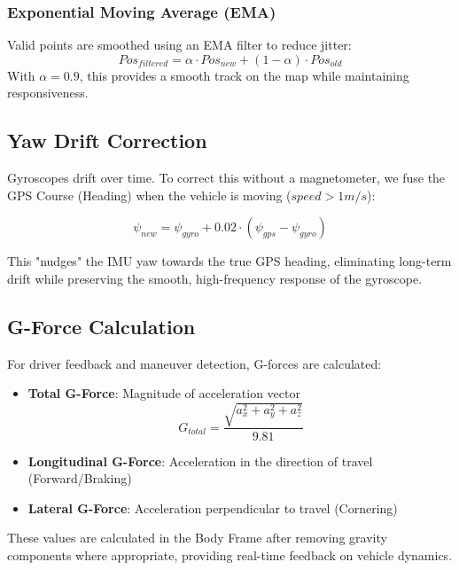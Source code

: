 \documentclass[11pt,a4paper]{article}
\begin{document}
\subsubsection{Exponential Moving Average (EMA)}
Valid points are smoothed using an EMA filter to reduce jitter:
\begin{equation}
Pos_{filtered} = \alpha \cdot Pos_{new} + (1 - \alpha) \cdot Pos_{old}
\end{equation}
With $\alpha = 0.9$, this provides a smooth track on the map while maintaining responsiveness.

\subsection{Yaw Drift Correction}
Gyroscopes drift over time. To correct this without a magnetometer, we fuse the GPS Course (Heading) when the vehicle is moving ($speed > 1 m/s$):

\begin{equation}
\psi_{new} = \psi_{gyro} + 0.02 \cdot (\psi_{gps} - \psi_{gyro})
\end{equation}

This "nudges" the IMU yaw towards the true GPS heading, eliminating long-term drift while preserving the smooth, high-frequency response of the gyroscope.

\subsection{G-Force Calculation}
For driver feedback and maneuver detection, G-forces are calculated:

\begin{itemize}
    \item \textbf{Total G-Force}: Magnitude of acceleration vector
    \begin{equation}
    G_{total} = \frac{\sqrt{a_x^2 + a_y^2 + a_z^2}}{9.81}
    \end{equation}
    
    \item \textbf{Longitudinal G-Force}: Acceleration in the direction of travel (Forward/Braking)
    \item \textbf{Lateral G-Force}: Acceleration perpendicular to travel (Cornering)
\end{itemize}

These values are calculated in the Body Frame after removing gravity components where appropriate, providing real-time feedback on vehicle dynamics.
\end{document}
